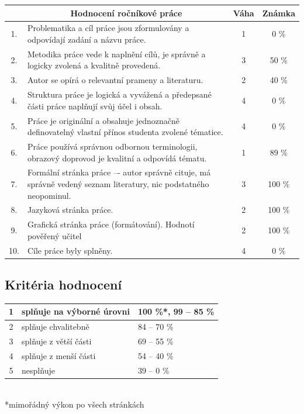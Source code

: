 \documentclass[a4paper,10pt]{article}
\begin{document}
\begin{center}
 \begin{tabular}{c|m{}|c|c}
  & \multicolumn{1}{c|}{\textsf{Hodnocení ročníkové práce}} & \textsf{Váha} &
  \textsf{Známka}\\
  \toprule
  1. & Problematika a cíl práce jsou zformulovány a odpovídají zadání a názvu
  práce. & 1 &
  0 \%
  \\
  \midrule
  2. & Metodika práce vede k naplnění cílů, je správně a logicky zvolená a
  kvalitně provedená. & 3 &
  50 \%
  \\
  \midrule
  3. & Autor se opírá o relevantní prameny a literaturu. & 2 &
  40 \%
  \\
  \midrule
  4. & Struktura práce je logická a vyvážená a předepsané části práce naplňují
  svůj účel i obsah. & 4 &
  0 \%
  \\
  \midrule
  5. & Práce je originální a obsahuje jednoznačně definovatelný vlastní přínos
  studenta zvolené tématice. & 4 &
  0 \%
  \\
  \midrule
  6. & Práce používá správnou odbornou terminologii, obrazový doprovod je
  kvalitní a odpovídá tématu. & 1 &
  89 \%
  \\
  \midrule
  7. & Formální stránka práce –- autor správně cituje, má správně vedený seznam
  literatury, nic podstatného neopominul. & 3 &
  100 \%
  \\
  \midrule
  8. & Jazyková stránka práce. & 2 &
  100 \%
  \\
  \midrule
  9. & Grafická stránka práce (formátování). Hodnotí pověřený učitel & 2 &
  100 \%
  \\
  \midrule
  10. & Cíle práce byly splněny. & 4 &
  0 \%
 \end{tabular}
\end{center}

\begin{center}
\end{center}

\subsection*{\sffamily\centering Kritéria hodnocení}
\begin{center}
 \begin{tabular}{c|l|l}
  1 & splňuje na výborné úrovni & 100 \%*, 99 -- 85 \% \\
  \midrule
  2 & splňuje chvalitebně & 84 -- 70 \% \\
  \midrule
  3 & splňuje z větší části & 69 -- 55 \% \\
  \midrule
  4 & splňuje z menší části & 54 -- 40 \% \\
  \midrule
  5 & nesplňuje & 39 -- 0 \%
 \end{tabular}\\
 *\footnotesize{mimořádný výkon po všech stránkách}
\end{center}
\end{document}
